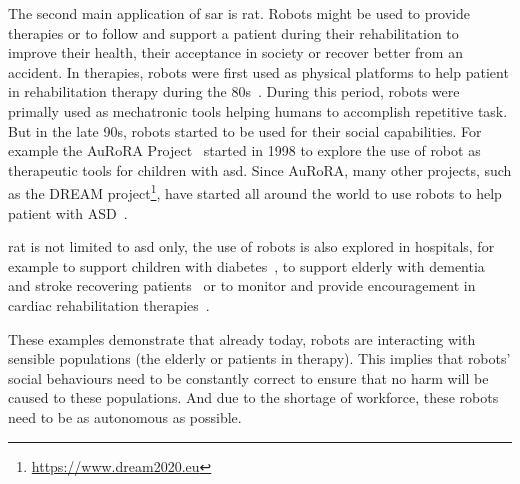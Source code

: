 		
	The second main application of \gls{sar} is \gls{rat}. Robots might be used to provide therapies or to follow and support a patient during their rehabilitation to improve their health, their acceptance in society or recover better from an accident. In therapies, robots were first used as physical platforms to help patient in rehabilitation therapy during the 80s~\citep{harwin1988robot}. During this period, robots were primally used as mechatronic tools helping humans to accomplish repetitive task. But in the late 90s, robots started to be used for their social capabilities. For example the AuRoRA Project~\citep{dautenhahn1999robots} started in 1998 to explore the use of robot as therapeutic tools for children with \gls{asd}. Since AuRoRA, many other projects, such as the DREAM project\footnote{\url{https://www.dream2020.eu}}, have started all around the world to use robots to help patient with ASD~\citep{diehl2012clinical,esteban2017build}. 
	
	\gls{rat} is not limited to \gls{asd} only, the use of robots is also explored in hospitals, for example to support children with diabetes~\citep{belpaeme2012multimodal}, to support elderly with dementia~\citep{wada2005psychological} and stroke recovering patients~\citep{mataric2007socially} or to monitor and provide encouragement in cardiac rehabilitation therapies~\citep{lara2017human}.	
	
	These examples demonstrate that already today, robots are interacting with sensible populations (the elderly or patients in therapy). This implies that robots' social behaviours need to be constantly correct to ensure that no harm will be caused to these populations. And due to the shortage of workforce, these robots need to be as autonomous as possible.
	
